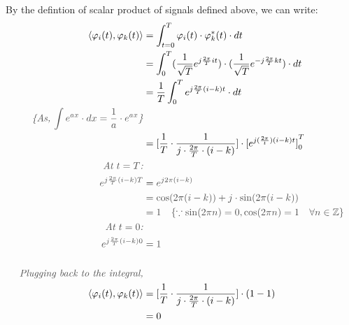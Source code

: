 \documentclass[letterpaper,12pt]{article}
\newcommand{\annot}[1]{\textcolor{darkgray}{\textit{#1}}}
\begin{document}
By the defintion of scalar product of signals defined above, we can write:
\begin{align*}
    \langle \varphi_{i}(t), \varphi_{k}(t) \rangle                  & = \int_{t=0}^{T} \varphi_{i}(t) \cdot \varphi_{k}^{*}(t) \cdot dt                                                     \\
                                                                    & = \int_{0}^{T}(\frac{1}{\sqrt{T}} e^{j\frac{2\pi}{T}i t}) \cdot (\frac{1}{\sqrt{T}} e^{-j\frac{2\pi}{T}k t}) \cdot dt \\
                                                                    & = \frac{1}{T} \int_{0}^{T} e^{j\frac{2\pi}{T}(i-k) t} \cdot dt                                                        \\
    \annot{\{As, $\int e^{ax}\cdot dx = \frac{1}{a}\cdot e^{ax}$\}} &                                                                                                                       \\
                                                                    & =  [\frac{1}{T}\cdot\frac{1}{j\cdot\frac{2\pi}{T}\cdot (i-k)}]\cdot {[e^{j (\frac{2\pi}{t}) (i-k)t}]}^{T}_{0}         \\
    \annot{At $t=T$:}                                               &                                                                                                                       \\
    \annot{$e^{j \frac{2 \pi}{T} (i-k) T}$}                         & = \annot{$e^{j 2\pi(i-k)}$}                                                                                           \\
                                                                    & = \annot{$\cos(2\pi(i-k)) + j\cdot \sin(2\pi(i-k))$}                                                                  \\
                                                                    & = \annot{$1 \quad \{\because \sin(2\pi n) = 0, \cos(2\pi n) = 1 \quad \forall n \in \mathbb{Z}\}$}                    \\
    \annot{At $t=0$:}                                               &                                                                                                                       \\
    \annot{$e^{j \frac{2 \pi}{T} (i-k) 0}$}                         & = \annot{$1$}                                                                                                         \\ \\
    \annot{Plugging back to the integral,}                          &                                                                                                                       \\
    \langle \varphi_{i}(t), \varphi_{k}(t) \rangle                  & = [\frac{1}{T}\cdot\frac{1}{j\cdot\frac{2\pi}{T}\cdot (i-k)}]\cdot (1 - 1)                                            \\
                                                                    & = 0
\end{align*}
\end{document}
